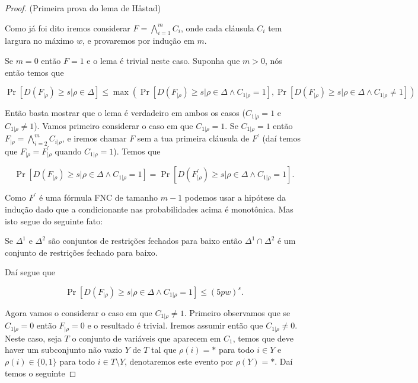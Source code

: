 \begin{proof} (Primeira prova do lema de Håstad)

Como já foi dito iremos considerar  $F = \bigwedge_{i = 1}^{m} C_{i}$, onde cada cláusula $C_{i}$ tem largura no máximo $w$, e provaremos por indução em $m$.

Se $m = 0$ então $F = 1$ e o lema é trivial neste caso. Suponha que $m > 0$, nós então temos que

\begin{equation*}
	\Pr[D(F_{\lvert \rho}) \geq s \lvert \rho \in \Delta] \leq \max(\Pr[D(F_{\lvert \rho}) \geq s \lvert \rho \in \Delta \land C_{1 \lvert \rho} = 1], \Pr[D(F_{\lvert \rho}) \geq s \lvert \rho \in \Delta \land C_{1 \lvert \rho} \neq 1])
\end{equation*}

Então basta mostrar que o lema é verdadeiro em ambos os casos ($C_{1 \lvert \rho} = 1$ e $C_{1 \lvert \rho} \neq 1$). Vamos primeiro considerar o caso em que $C_{1 \lvert \rho} = 1$. Se $C_{1 \lvert \rho} = 1$ então $F_{\lvert \rho} = \bigwedge_{i  = 2}^{m}C_{i \lvert \rho}$, e iremos chamar $F$ sem a tua primeira cláusula de $F^{\prime}$ (daí temos que $F_{\lvert \rho} = F^{\prime}_{\lvert \rho}$ quando $C_{1 \lvert \rho} = 1$). Temos que

\begin{equation*}
 	\Pr[D(F_{\lvert \rho}) \geq s \lvert \rho \in \Delta \land C_{1 \lvert \rho} = 1] = \Pr[D(F_{\lvert \rho}^{\prime}) \geq s \lvert \rho \in \Delta \land C_{1 \lvert \rho} = 1].
\end{equation*}

Como $F^{\prime}$ é uma fórmula FNC de tamanho $m - 1$ podemos usar a hipótese da indução dado que a condicionante nas probabilidades acima é monotônica. Mas isto segue do seguinte fato:

\begin{fato*}
	Se $\Delta^{1}$ e $\Delta^{2}$ são conjuntos de restrições fechados para baixo então $\Delta^{1} \cap \Delta^{2}$ é um conjunto de restrições fechado para baixo.
\end{fato*}

Daí segue que

\begin{equation*}
	\Pr[D(F_{\lvert \rho}) \geq s \lvert \rho \in \Delta \land C_{1 \lvert \rho} = 1] \leq (5pw)^{s}.
\end{equation*}

Agora vamos o considerar o caso em que $C_{1 \lvert \rho} \neq 1$. Primeiro observamos que se $C_{1 \lvert \rho} = 0$ então $F_{\lvert \rho} = 0$ e o resultado é trivial. Iremos assumir então que $C_{1 \lvert \rho} \neq 0$. Neste caso, seja $T$ o conjunto de variáveis que aparecem em $C_{1}$, temos que deve haver um subconjunto não vazio $Y$ de $T $ tal que $\rho(i) = *$ para todo $i \in Y$ e $\rho(i) \in \{0, 1\}$ para todo $i \in T \setminus Y$, denotaremos este evento por $\rho(Y) = *$. Daí temos o seguinte


\end{proof}
